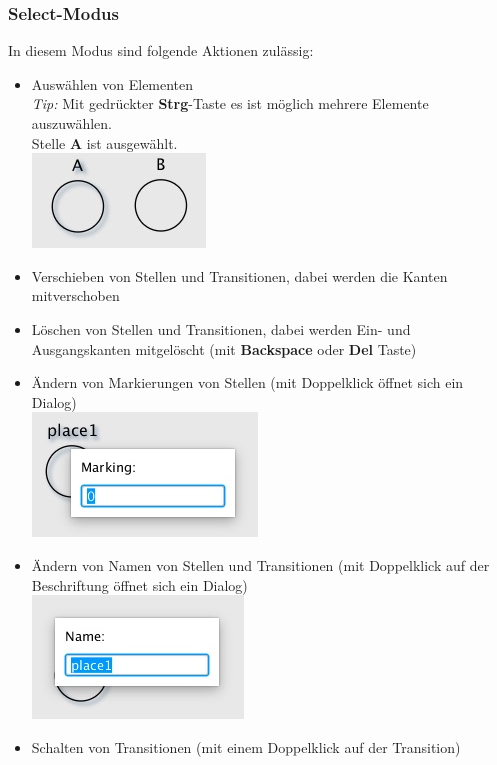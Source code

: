 \documentclass[12pt]{article}
\begin{document}
\subsubsection{Select-Modus}

In diesem Modus sind folgende Aktionen zulässig:
\begin{itemize}
\item{Auswählen von Elementen} \\
\emph{Tip: }Mit gedrückter \textbf{Strg}-Taste es ist möglich mehrere Elemente auszuwählen. \\
Stelle \textbf{A} ist ausgewählt. \\
\includegraphics[scale=0.5]{select}
\item{Verschieben von Stellen und Transitionen, dabei werden die Kanten mitverschoben}
\item{Löschen von Stellen und Transitionen, dabei werden Ein- und Ausgangskanten mitgelöscht (mit \textbf{Backspace} oder \textbf{Del} Taste)}
\item{Ändern von Markierungen von Stellen (mit Doppelklick öffnet sich ein Dialog)} \\
\includegraphics[scale=0.5]{marking}
\item{Ändern von Namen von Stellen und Transitionen (mit Doppelklick auf der Beschriftung öffnet sich ein Dialog) } \\
\includegraphics[scale=0.55]{name}
\item{Schalten von Transitionen (mit einem Doppelklick auf der Transition)} \\

\end{itemize}
\end{document}
